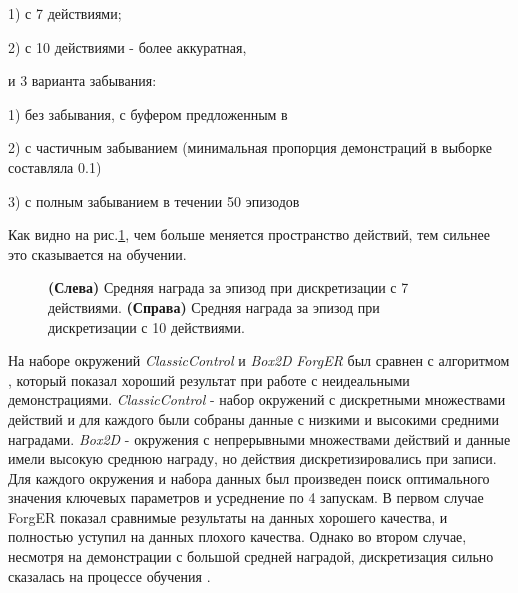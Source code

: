 \documentclass{mipt-thesis-bs}
\begin{document}
1) с 7 действиями;

2) с 10 действиями - более аккуратная,

и 3 варианта забывания:

1) без забывания, с буфером предложенным в \cite{dqfd}

2) с частичным забыванием (минимальная пропорция демонстраций в выборке составляла 0.1)

3) с полным забыванием в течении 50 эпизодов

Как видно на рис.\ref{treechop}, чем больше меняется пространство действий, тем сильнее это сказывается на обучении. 

\begin{figure}[ht]
    \centering
    \hspace{0.08\linewidth}
    \vspace{-0.2cm}
    \caption{ \textbf{(Слева)} Средняя награда за эпизод при дискретизации с 7 действиями.
    \textbf{(Справа)} Средняя награда за эпизод при дискретизации с 10 действиями.
    \label{treechop}
    }
\end{figure}

На наборе окружений \textit{ClassicControl} и \textit{Box2D} \textit{ForgER} был сравнен с алгоритмом \cite{pofd}, который показал хороший результат при работе с неидеальными демонстрациями. \textit{ClassicControl} - набор окружений с дискретными множествами действий и для каждого были собраны данные с низкими и высокими средними наградами. \textit{Box2D} - окружения с непрерывными множествами действий и данные имели высокую среднюю награду, но действия дискретизировались при записи. Для каждого окружения и набора данных был произведен поиск оптимального значения ключевых параметров и усреднение по 4 запускам. В первом случае ForgER показал сравнимые результаты на данных хорошего качества, и полностью уступил на данных плохого качества. Однако во втором случае, несмотря на демонстрации с большой средней наградой, дискретизация сильно сказалась на процессе обучения \cite{pofd}.  
\end{document}
